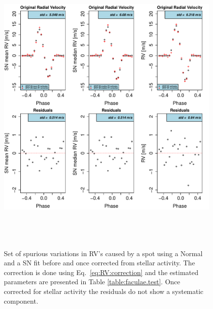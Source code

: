 \documentclass[11pt, oneside]{article}
\begin{document}
\begin{figure}[htbp]
   \centering
\includegraphics[height = 6in]{Spot_NEW_CORRECTION_[3]CorrectionActivity_RadialVelocity_vs_time.pdf} 
   \caption{Set of  spurious variations in RV's caused by a spot using a Normal and a SN fit before and once corrected from stellar activity. The correction is done using Eq.~\ref{eq:RV:correction} and the estimated parameters are presented in Table \ref{table:faculae.test}. Once corrected for stellar activity the residuals do not show a systematic component.}
    \label{fig:spot.correction}
\end{figure}
\end{document}
